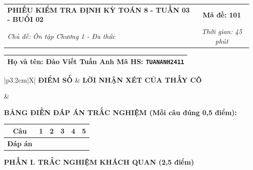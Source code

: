 \documentclass[12pt,a4paper]{article}
\begin{document}
\pagestyle{empty}



\noindent
\begin{tabularx}{\linewidth}{|X|c|}
\hline
\textbf{PHIẾU KIỂM TRA ĐỊNH KỲ TOÁN 8 - TUẦN 03 - BUỔI 02} & \textbf{Mã đề: 101} \\
\textit{Chủ đề: Ôn tập Chương 1 - Đa thức} & \textit{Thời gian: 45 phút} \\
\hline
\end{tabularx}

\vspace{1mm}

\noindent
\begin{tabularx}{\linewidth}{|X|}
\hline
\rule[-2mm]{0pt}{7.5mm}\textbf{Họ và tên:} \textbf{\large Đào Viết Tuấn Anh} \hfill \textbf{Mã HS:} \texttt{TUANANH2411} \quad \\
\hline
\end{tabularx}

\vspace{1mm}

\noindent
\begin{tabularx}{\linewidth}{|p{3.2cm}|X|}
\hline
\centering\textbf{ĐIỂM SỐ} & \centering\textbf{LỜI NHẬN XÉT CỦA THẦY CÔ} \tabularnewline
\hline
\rule{0pt}{1.3cm} & \tabularnewline
\hline
\end{tabularx}

\vspace{1.2mm}

\noindent\textbf{BẢNG ĐIỀN ĐÁP ÁN TRẮC NGHIỆM (Mỗi câu đúng 0,5 điểm):}
\vspace{0.8mm}

\noindent
\renewcommand{\arraystretch}{1.35}
\begin{tabularx}{\linewidth}{|c|*{5}{>{\centering\arraybackslash}X|}}
\hline
\textbf{Câu} & \textbf{1} & \textbf{2} & \textbf{3} & \textbf{4} & \textbf{5} \\
\hline
\textbf{Đáp án} & & & & & \\
\hline
\end{tabularx}
\renewcommand{\arraystretch}{1.0}

\vspace{1.5mm}

\noindent\textbf{\large PHẦN I. TRẮC NGHIỆM KHÁCH QUAN (2,5 điểm)}
\vspace{1mm}
\end{document}
